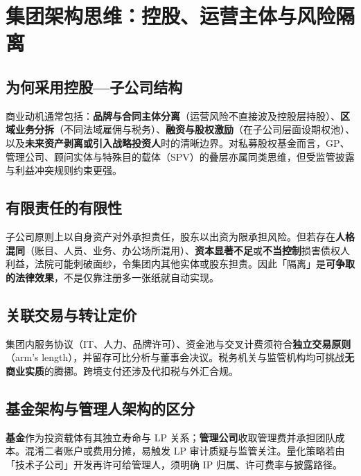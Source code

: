 \chapter{集团架构思维：控股、运营主体与风险隔离}

\section{为何采用控股—子公司结构}

商业动机通常包括：\textbf{品牌与合同主体分离}（运营风险不直接波及控股层持股）、\textbf{区域业务分拆}（不同法域雇佣与税务）、\textbf{融资与股权激励}（在子公司层面设期权池）、以及\textbf{未来资产剥离或引入战略投资人}时的清晰边界。对私募股权基金而言，GP、管理公司、顾问实体与特殊目的载体（SPV）的叠层亦属同类思维，但受监管披露与利益冲突规则约束更强。

\section{有限责任的有限性}

子公司原则上以自身资产对外承担责任，股东以出资为限承担风险。但若存在\textbf{人格混同}（账目、人员、业务、办公场所混用）、\textbf{资本显著不足}或\textbf{不当控制}损害债权人利益，法院可能刺破面纱，令集团内其他实体或股东担责。因此「隔离」是\textbf{可争取的法律效果}，不是仅靠注册多一张纸就自动实现。

\section{关联交易与转让定价}

集团内服务协议（IT、人力、品牌许可）、资金池与交叉计费须符合\textbf{独立交易原则}（arm's length），并留存可比分析与董事会决议。税务机关与监管机构均可挑战\textbf{无商业实质}的腾挪。跨境支付还涉及代扣税与外汇合规。

\section{基金架构与管理人架构的区分}

\textbf{基金}作为投资载体有其独立寿命与 LP 关系；\textbf{管理公司}收取管理费并承担团队成本。混淆二者账户或费用分摊，易触发 LP 审计质疑与监管关注。量化策略若由「技术子公司」开发再许可给管理人，须明确 IP 归属、许可费率与披露路径。

